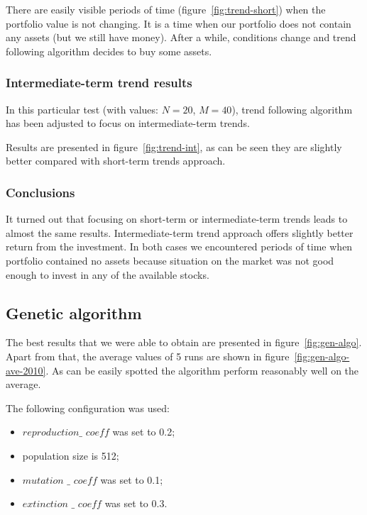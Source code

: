 There are easily visible periods of time (figure~\ref{fig:trend-short}) when the portfolio value is not changing. 
It is a time when our portfolio does not contain any assets (but we still have money). 
After a while, conditions change and trend following algorithm decides to buy some assets.


\subsubsection{Intermediate-term trend results}
\label{trend-foll-inter}

In this particular test (with values: $N = 20$, $M = 40$), trend following algorithm has been adjusted to focus on intermediate-term trends.
 


Results are presented in figure~\ref{fig:trend-int}, as can be seen they are slightly better compared with short-term trends approach.  

\subsubsection{Conclusions}

It turned out that focusing on short-term or intermediate-term trends leads to almost the same results.
Intermediate-term trend approach offers slightly better return from the investment.
In both cases we encountered periods of time when portfolio contained no assets because situation on the market was not good enough to invest in any of the available stocks.



\subsection{Genetic algorithm}

The best results that we were able to obtain are presented in figure~\ref{fig:gen-algo}.
Apart from that, the average values of 5 runs are shown in figure~\ref{fig:gen-algo-ave-2010}.
As can be easily spotted the algorithm perform reasonably well on the average.

The following configuration was used:
\begin{itemize}
  \item $reproduction\_$ $coeff$ was set to 0.2;
  \item population size is 512;
  \item $mutation$ $\_$ $coeff$ was set to 0.1;
  \item $extinction$ $\_$ $coeff$ was set to 0.3.
\end{itemize}

